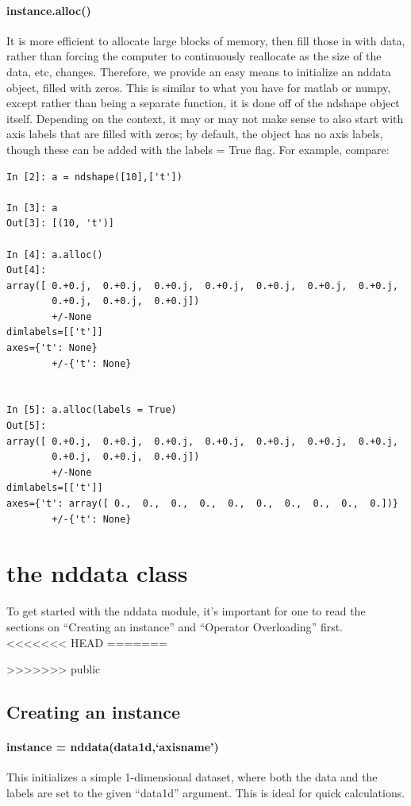 \paragraph{instance.alloc()}
It is more efficient to allocate large blocks of memory, then fill those in with data, rather than forcing the computer to continuously reallocate as the size of the data, etc, changes.
Therefore, we provide an easy means to initialize an nddata object, filled with zeros.
This is similar to what you have for matlab or numpy, except rather than being a separate function, it is done off of the ndshape object itself.
Depending on the context, it may or may not make sense to also start with axis labels that are filled with zeros;
by default, the object has no axis labels, though these can be added with the labels = True flag.
For example, compare:
\begin{lstlisting}
In [2]: a = ndshape([10],['t'])

In [3]: a
Out[3]: [(10, 't')]

In [4]: a.alloc()
Out[4]:
array([ 0.+0.j,  0.+0.j,  0.+0.j,  0.+0.j,  0.+0.j,  0.+0.j,  0.+0.j,
        0.+0.j,  0.+0.j,  0.+0.j])
        +/-None
dimlabels=[['t']]
axes={'t': None}
        +/-{'t': None}


In [5]: a.alloc(labels = True)
Out[5]:
array([ 0.+0.j,  0.+0.j,  0.+0.j,  0.+0.j,  0.+0.j,  0.+0.j,  0.+0.j,
        0.+0.j,  0.+0.j,  0.+0.j])
        +/-None
dimlabels=[['t']]
axes={'t': array([ 0.,  0.,  0.,  0.,  0.,  0.,  0.,  0.,  0.,  0.])}
        +/-{'t': None}
\end{lstlisting}
\section{the nddata class}
To get started with the nddata module,
    it's important for one to read the sections on ``Creating an instance''
    and ``Operator Overloading'' first.
<<<<<<< HEAD
=======

>>>>>>> public
\subsection{Creating an instance}
\paragraph{instance = nddata(data1d,`axisname')}
This initializes a simple 1-dimensional dataset,
    where both the data and the labels are set to the given ``data1d'' argument.
This is ideal for quick calculations.
